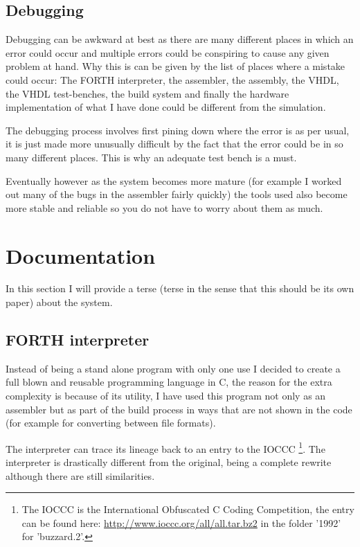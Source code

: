 \documentclass	[a4paper, 10pt]	{article}
\begin{document}
    \subsection{Debugging}

    Debugging can be awkward at best as there are many different places in which
    an error could occur and multiple errors could be conspiring to cause any
    given problem at hand. Why this is can be given by the list of places where
    a mistake could occur: The FORTH interpreter, the assembler, the assembly, the
    VHDL, the VHDL test-benches, the build system and finally the hardware implementation
    of what I have done could be different from the simulation. 

    The debugging process involves first pining down where the error is as
    per usual, it is just made more unusually difficult by the fact that the error
    could be in so many different places. This is why an adequate test bench is
    a must.

    Eventually however as the system becomes more mature (for example I worked out
    many of the bugs in the assembler fairly quickly) the tools used also become
    more stable and reliable so you do not have to worry about them as much.

  \section{Documentation}

  In this section I will provide a terse (terse in the sense that this should
  be its own paper) about the system.

    \subsection{FORTH interpreter}

    Instead of being a stand alone program with only one use I decided to create
    a full blown and reusable programming language in C, the reason for the extra
    complexity is because of its utility, I have used this program not only as an
    assembler but as part of the build process in ways that are not shown in the
    code (for example for converting between file formats).

    The interpreter can trace its lineage back to an entry to the IOCCC \footnote{
    The IOCCC is the International Obfuscated C Coding Competition, the entry can
    be found here: \url{http://www.ioccc.org/all/all.tar.bz2} in the folder '1992'
    for 'buzzard.2'.}. The interpreter is drastically different from the original,
    being a complete rewrite although there are still similarities. 
\end{document}
